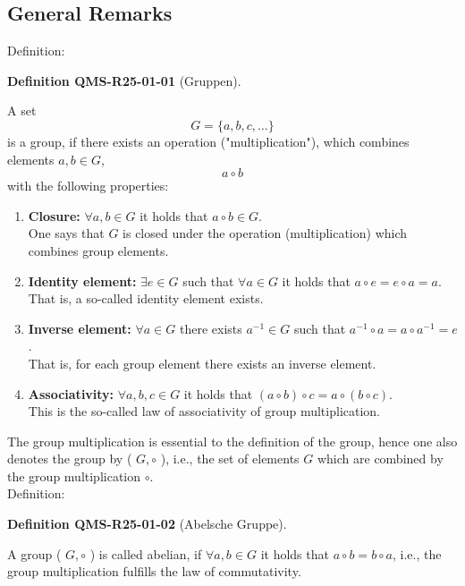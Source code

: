 \documentclass[10pt, letterpaper]{article}
\newcommand{\CustomHeading}[3]{%
  \par\medskip\noindent%
  \textbf{#1 #2} \textnormal{(#3)}.\enskip%
}
\newenvironment{DEF}[2]{\begin{unitbox}\CustomHeading{Definition}{#1}{#2}}{\end{unitbox}}
\begin{document}
\subsection{General Remarks}


Definition: 

\begin{DEF}{QMS-R25-01-01}{Gruppen}
A set
$$
G=\{a, b, c, \ldots\}
$$
is a group, if there exists an operation ("multiplication"), which combines elements $a, b \in G$,
$$
a \circ b
$$
with the following properties:\\
\begin{enumerate}
  \item \textbf{Closure:} $\forall a, b \in G$ it holds that $a \circ b \in G$.\\
  One says that $G$ is closed under the operation (multiplication) which combines group elements.
  
  \item \textbf{Identity element:} $\exists e \in G$ such that $\forall a \in G$ it holds that $a \circ e = e \circ a = a$.\\
  That is, a so-called identity element exists.

  \item \textbf{Inverse element:} $\forall a \in G$ there exists $a^{-1} \in G$ such that $a^{-1} \circ a = a \circ a^{-1} = e$.\\
  That is, for each group element there exists an inverse element.

  \item \textbf{Associativity:} $\forall a, b, c \in G$ it holds that $(a \circ b) \circ c = a \circ (b \circ c)$.\\
  This is the so-called law of associativity of group multiplication.
\end{enumerate}
\end{DEF}


The group multiplication is essential to the definition of the group, hence one also denotes the group by ( $G, \circ$ ), i.e., the set of elements $G$ which are combined by the group multiplication $\circ$.\\


Definition: 

\begin{DEF}{QMS-R25-01-02}{Abelsche Gruppe}
A group ( $G, \circ$ ) is called abelian, if $\forall a, b \in G$ it holds that $a \circ b=b \circ a$, i.e., the group multiplication fulfills the law of commutativity.
\end{DEF}
\end{document}
